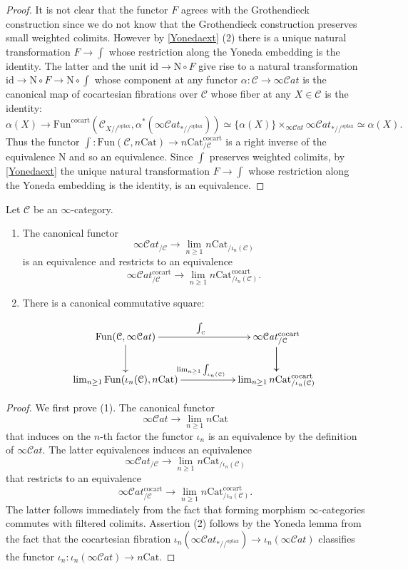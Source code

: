 \documentclass[10pt,oneside]{article}
\numberwithin{equation}{section} %
\numberwithin{figure}{section} %
\theoremstyle{plain}
\theoremstyle{definition}
\newcommand{\mC}{{\mathcal C}}
\newcommand{\N}{{\mathrm N}}
\newcommand{\n}{{n}}
\newcommand{\id}{\mathrm{id}}
\newcommand{\Cat}{\mathrm{Cat}}
\newcommand{\Fun}{\mathrm{Fun}}
\newcommand{\cocart}{{\mathrm{cocart}}}
\newcommand{\oplax}{{\mathrm{oplax}}}
\newcommand{\scat}{\mathcal{C}\mathit{at}}
\begin{document}
\begin{proof}
It is not clear that the functor $F$ agrees with the Grothendieck construction since we do not know that the Grothendieck construction preserves small weighted colimits.
However by \cref{Yonedaext} (2) there is a unique natural transformation
$F \to \int $ whose restriction along the Yoneda embedding is the identity.
The latter and the unit $\id \to \N \circ F$ give rise to a natural transformation $ \id \to \N \circ F \to \N \circ \int$
whose component at any functor $\alpha: \mC \to \infty\scat$
is the canonical map of cocartesian fibrations over $\mC$ whose fiber at any $X \in \mC$ is the identity:  
$$\alpha(X) \to \Fun^\cocart(\mC_{X//^\oplax}, \alpha^*(\infty\scat_{*//^\oplax})) \simeq \{\alpha(X)\}\times_{\infty\scat} \infty\scat_{*//^\oplax} \simeq\alpha(X).$$
Thus the functor $\int: \Fun(\mC, n\Cat) \to n\Cat^\cocart_{/\mC} $ is 
a right inverse of the equivalence $\N$ and so an equivalence.
Since $\int$ preserves weighted colimits, by \cref{Yonedaext} the unique natural transformation $F \to \int $ whose restriction along the Yoneda embedding is the identity, is an equivalence.
\end{proof}

\begin{lemma}
Let $\mC$ be an $\infty$-category.

\begin{enumerate}[\normalfont(1)]\setlength{\itemsep}{-2pt}
\item
The canonical functor $$\infty\scat_{/\mC} \to \lim_{n \geq 1} n\Cat_{/\iota_n(\mC)} $$ is an equivalence and restricts to an 
equivalence $$ \infty\scat^\cocart_{/\mC} \to \lim_{n \geq 1} n\Cat^\cocart_{/\iota_n(\mC)} .$$

\item There is a canonical commutative square:

$$\begin{xy}
\xymatrix{
\Fun(\mC,\infty\scat) \ar[d]^{} \ar[rr]^{\int_\mC}
&& \infty\scat^\cocart_{/\mC} \ar[d] \ar[d]^{}
\\ 
\lim_{n \geq 1} \Fun(\iota_n(\mC),n\Cat)
\ar[rr]^{\lim_{n \geq 1} \int_{\iota_n(\mC)}} && \lim_{n \geq 1} n\Cat^\cocart_{/\iota_n(\mC)}
}
\end{xy}$$	
\end{enumerate}
\end{lemma}

\begin{proof}
We first prove (1). The canonical functor $$\infty\scat \to \lim_{n \geq 1} n\Cat $$ 
that induces on the $\n$-th factor the functor $\iota_n$ is an equivalence by the definition of $\infty\scat$.
The latter equivalences induces an equivalence
$$ \infty\scat_{/\mC} \to \lim_{n \geq 1} n\Cat_{/\iota_n(\mC)} $$
that restricts to an equivalence $$ \infty\scat^\cocart_{/\mC} \to \lim_{n \geq 1} n\Cat^\cocart_{/\iota_n(\mC)}.$$
The latter follows immediately from the fact that forming morphism $\infty$-categories commutes with filtered colimits.
Assertion (2) follows by the Yoneda lemma from the fact that
the cocartesian fibration $ \iota_n(\infty\scat_{*//^\oplax}) \to \iota_n(\infty\scat) $ classifies the functor 
$ \iota_n: \iota_n(\infty\scat) \to \n\Cat .$
\end{proof}
\end{document}
